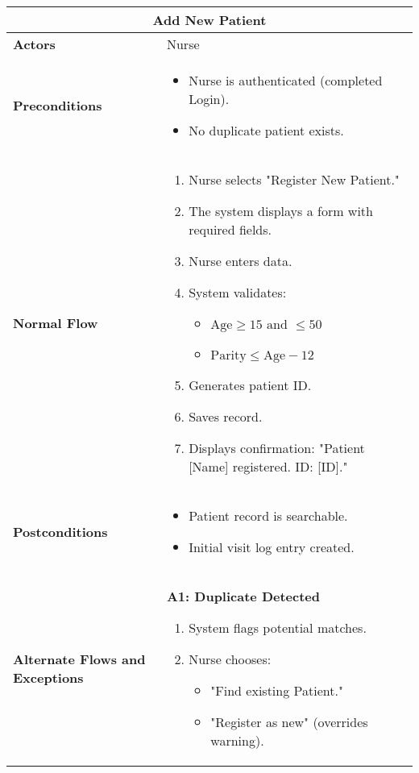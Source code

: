 \documentclass{article}
\begin{document}
\begin{longtable}{| p{5cm} | p{10cm} |}
    \hline
    \multicolumn{2}{|c|}{\textbf{Add New Patient}} \\
    \hline
    \textbf{Actors} & Nurse \\
    \hline
    \textbf{Preconditions} & 
    \begin{itemize}
        \item Nurse is authenticated (completed Login).
        \item No duplicate patient exists.
    \end{itemize} \\
    \hline
    \textbf{Normal Flow} & 
    \begin{enumerate}
        \item Nurse selects "Register New Patient."
        \item The system displays a form with required fields.
        \item Nurse enters data.
        \item System validates:
        \begin{itemize}
            \item \(\text{Age} \geq 15 \text{ and } \leq 50\)
        
            \item \(\text{Parity} \leq \text{Age} - 12\)
        \end{itemize}

        \item Generates patient ID.
        \item Saves record.
        \item Displays confirmation: "Patient [Name] registered. ID: [ID]."
    \end{enumerate} \\
    \hline
    \textbf{Postconditions} & 
    \begin{itemize}
        \item Patient record is searchable.
        \item Initial visit log entry created.
    \end{itemize} \\
    \hline
    \textbf{Alternate Flows and Exceptions} & 
    \textbf{A1: Duplicate Detected}  
    \begin{enumerate}
        \item System flags potential matches.
        \item Nurse chooses:
        \begin{itemize}
            \item "Find existing Patient."
            \item "Register as new" (overrides warning).
        \end{itemize}
    \end{enumerate}


\end{longtable}
\end{document}
